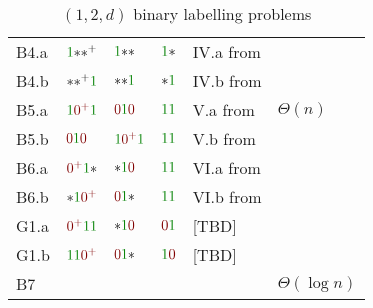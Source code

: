 \begin{table}[th]
\begin{tabularx}{0.95\textwidth}{llllXl}
        B4.a & $\y\x\xpl$ & $\y\x\x$ & $\y\x$ & \textsf{IV.a} from \cite{balliu-2019} &\\
        B4.b & $\x\xpl\y$ & $\x\x\y$ & $\x\y$ & \textsf{IV.b} from \cite{balliu-2019} &\\
        \midrule
        B5.a & $\y\npl\y$ & $\n\y\n$ & $\y\y$ & \textsf{V.a} from \cite{balliu-2019} & \boldmath$\Theta(n)$\\
        B5.b & $\n\y\n$ & $\y\npl\y$ & $\y\y$ & \textsf{V.b} from \cite{balliu-2019} & \\
    \addlinespace
        B6.a & $\npl\y\x$ & $\x\y\n$ & $\y\y$ & \textsf{VI.a} from \cite{balliu-2019} & \\
        B6.b & $\x\y\npl$ & $\n\y\x$ & $\y\y$ & \textsf{VI.b} from \cite{balliu-2019} & \\
    \addlinespace
        G1.a & $\npl\y\y$ & $\x\y\n$ & $\n\y$ & [TBD]\\
        G1.b & $\y\y\npl$ & $\n\y\x$ & $\y\n$ & [TBD]\\
        \midrule
        B7 &&&&&\boldmath$\Theta(\log n)$\\
        \bottomrule
    \end{tabularx}
    \caption{$(1,2,d)$ binary labelling problems}
    \label{tab:blclass}
\end{table}